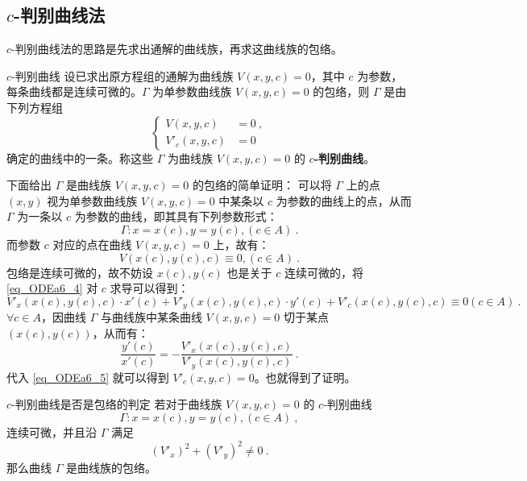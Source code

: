 \subsection{$c$-判别曲线法}\label{sub_ODEa6_2}
$c$-判别曲线法的思路是先求出通解的曲线族，再求这曲线族的包络。
\begin{definition}{$c$-判别曲线}
设已求出原方程组的通解为曲线族 $V(x,y,c)=0$，其中 $c$ 为参数，每条曲线都是连续可微的。$\Gamma$ 为单参数曲线族 $V(x,y,c)=0$ 的包络，则 $\Gamma$ 是由下列方程组
\begin{equation}\label{eq_ODEa6_3}
\left \{
\begin{aligned}
V(x,y,c) &= 0~,\\
V'_c(x,y,c) &= 0~
\end{aligned}
\right .
\end{equation}
确定的曲线中的一条。称这些 $\Gamma$ 为曲线族 $V(x,y,c)=0$ 的 \textbf{$c$-判别曲线}。
\end{definition}
下面给出 $\Gamma$ 是曲线族 $V(x,y,c)=0$ 的包络的简单证明：
可以将 $\Gamma$ 上的点 $(x, y)$ 视为单参数曲线族 $V(x,y,c)=0$ 中某条以 $c$ 为参数的曲线上的点，从而 $\Gamma$ 为一条以 $c$ 为参数的曲线，即其具有下列参数形式：
\begin{equation}
\Gamma: x=x(c), y=y(c), (c \in A) ~.
\end{equation}
而参数 $c$ 对应的点在曲线 $V(x,y,c)=0$ 上，故有：
\begin{equation}\label{eq_ODEa6_4}
V(x(c), y(c), c) \equiv 0, (c \in A) ~.
\end{equation}
包络是连续可微的，故不妨设 $x(c), y(c)$ 也是关于 $c$ 连续可微的，将 \autoref{eq_ODEa6_4} 对 $c$ 求导可以得到：
\begin{equation}\label{eq_ODEa6_5}
V'_x(x(c), y(c), c) \cdot x'(c) + V'_y(x(c), y(c), c) \cdot y'(c) + V'_c(x(c), y(c), c) \equiv 0 (c \in A)~.
\end{equation}
$\forall c \in A$，因曲线 $\Gamma$ 与曲线族中某条曲线 $V(x,y,c)=0$ 切于某点 $(x(c), y(c))$，从而有：
\begin{equation}\label{eq_ODEa6_6}
\frac{y'(c)}{x'(c)} = -\frac{V'_x(x(c), y(c), c)}{V'_y(x(c), y(c), c)} ~.
\end{equation}
代入 \autoref{eq_ODEa6_5} 就可以得到 $V'_c(x, y, c)=0$。也就得到了证明。

\begin{theorem}{$c$-判别曲线是否是包络的判定}
若对于曲线族 $V(x,y,c)=0$ 的 $c$-判别曲线 
$$\Gamma: x=x(c), y=y(c), (c \in A) ~,$$
连续可微，并且沿 $\Gamma$ 满足
$$(V'_x)^2 + (V'_y)^2 \neq 0 ~.$$
那么曲线 $\Gamma$ 是曲线族的包络。
\end{theorem}
